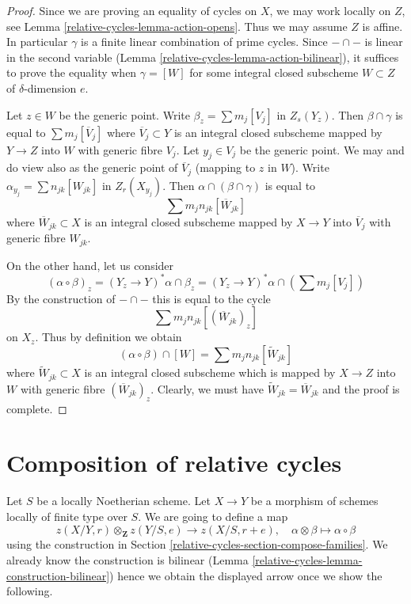 \begin{proof}
Since we are proving an equality of cycles on $X$, we may work locally
on $Z$, see Lemma \ref{relative-cycles-lemma-action-opens}. Thus we may assume $Z$
is affine. In particular $\gamma$ is a finite linear combination of prime
cycles. Since $- \cap -$ is linear in the second variable
(Lemma \ref{relative-cycles-lemma-action-bilinear}), it suffices
to prove the equality when $\gamma = [W]$ for some integral closed subscheme
$W \subset Z$ of $\delta$-dimension $e$.

\medskip\noindent
Let $z \in W$ be the generic point. Write $\beta_z = \sum m_j[V_j]$
in $Z_s(Y_z)$. Then $\beta \cap \gamma$ is equal to $\sum m_j[\overline{V}_j]$
where $\overline{V}_j \subset Y$ is an integral closed subscheme
mapped by $Y \to Z$ into $W$ with generic fibre $V_j$.
Let $y_j \in V_j$ be the generic point. We may and do view
also as the generic point of $\overline{V}_j$ (mapping to $z$ in $W$).
Write $\alpha_{y_j} = \sum n_{jk} [W_{jk}]$ in $Z_r(X_{y_j})$.
Then $\alpha \cap (\beta \cap \gamma)$ is equal to
$$
\sum m_j n_{jk} [\overline{W}_{jk}]
$$
where $\overline{W}_{jk} \subset X$ is an integral closed subscheme
mapped by $X \to Y$ into $\overline{V}_j$ with generic fibre $W_{jk}$.

\medskip\noindent
On the other hand, let us consider
$$
(\alpha \circ \beta)_z = (Y_z \to Y)^*\alpha \cap \beta_z =
(Y_z \to Y)^*\alpha \cap (\sum m_j [V_j])
$$
By the construction of $- \cap -$ this is equal to the cycle
$$
\sum m_j n_{jk} [(\overline{W}_{jk})_z]
$$
on $X_z$. Thus by definition we obtain
$$
(\alpha \circ \beta) \cap [W] =
\sum m_j n_{jk} [\widetilde{W}_{jk}]
$$
where $\widetilde{W}_{jk} \subset X$ is an integral closed subscheme which
is mapped by $X \to Z$ into $W$ with generic fibre $(\overline{W}_{jk})_z$.
Clearly, we must have $\widetilde{W}_{jk} = \overline{W}_{jk}$
and the proof is complete.
\end{proof}

\section{Composition of relative cycles}
\label{relative-cycles-section-compose}
Let $S$ be a locally Noetherian scheme. Let $X \to Y$
be a morphism of schemes locally of finite type over $S$.
We are going to define a map
$$
z(X/Y, r) \otimes_\mathbf{Z} z(Y/S, e) \longrightarrow z(X/S, r + e),\quad
\alpha \otimes \beta \longmapsto \alpha \circ \beta
$$
using the construction in Section \ref{relative-cycles-section-compose-families}.
We already know the construction is bilinear
(Lemma \ref{relative-cycles-lemma-construction-bilinear})
hence we obtain the displayed arrow once we show the following.

